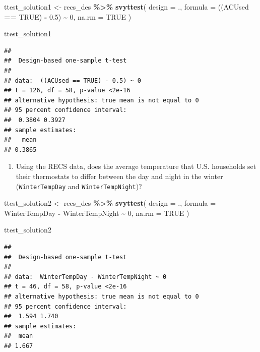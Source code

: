 \documentclass[
]{krantz}
\makeatletter
\newenvironment{Shaded}{\begin{snugshade}}{\end{snugshade}}
\newcommand{\AttributeTok}[1]{\textcolor[rgb]{0.27,0.27,0.27}{#1}}
\newcommand{\ConstantTok}[1]{\textcolor[rgb]{0.37,0.37,0.37}{#1}}
\newcommand{\DecValTok}[1]{\textcolor[rgb]{0.06,0.06,0.06}{#1}}
\newcommand{\FloatTok}[1]{\textcolor[rgb]{0.06,0.06,0.06}{#1}}
\newcommand{\FunctionTok}[1]{\textcolor[rgb]{0.27,0.27,0.27}{\textbf{#1}}}
\newcommand{\NormalTok}[1]{#1}
\newcommand{\OtherTok}[1]{\textcolor[rgb]{0.37,0.37,0.37}{#1}}
\newcommand{\SpecialCharTok}[1]{\textcolor[rgb]{0.43,0.43,0.43}{\textbf{#1}}}
\providecommand{\tightlist}{%
  \setlength{\itemsep}{0pt}\setlength{\parskip}{0pt}}
\newenvironment{kframe}{%
\medskip{}
\setlength{\fboxsep}{.8em}
 \def\at@end@of@kframe{}%
 \ifinner\ifhmode%
  \def\at@end@of@kframe{\end{minipage}}%
  \begin{minipage}{\columnwidth}%
 \fi\fi%
 \def\FrameCommand##1{\hskip\@totalleftmargin \hskip-\fboxsep
 \colorbox{shadecolor}{##1}\hskip-\fboxsep
     \hskip-\linewidth \hskip-\@totalleftmargin \hskip\columnwidth}%
 \MakeFramed {\advance\hsize-\width
   \@totalleftmargin\z@ \linewidth\hsize
   \@setminipage}}%
 {\par\unskip\endMakeFramed%
 \at@end@of@kframe}
\renewenvironment{Shaded}{\begin{kframe}}{\end{kframe}}
\makeatother
\begin{document}
\begin{Shaded}
\begin{Highlighting}[]
\NormalTok{ttest\_solution1 }\OtherTok{\textless{}{-}}\NormalTok{ recs\_des }\SpecialCharTok{\%\textgreater{}\%}
  \FunctionTok{svyttest}\NormalTok{(}
    \AttributeTok{design =}\NormalTok{ .,}
    \AttributeTok{formula =}\NormalTok{ ((ACUsed }\SpecialCharTok{==} \ConstantTok{TRUE}\NormalTok{) }\SpecialCharTok{{-}} \FloatTok{0.5}\NormalTok{) }\SpecialCharTok{\textasciitilde{}} \DecValTok{0}\NormalTok{,}
    \AttributeTok{na.rm =} \ConstantTok{TRUE}
\NormalTok{  )}

\NormalTok{ttest\_solution1}
\end{Highlighting}
\end{Shaded}

\begin{verbatim}
## 
##  Design-based one-sample t-test
## 
## data:  ((ACUsed == TRUE) - 0.5) ~ 0
## t = 126, df = 58, p-value <2e-16
## alternative hypothesis: true mean is not equal to 0
## 95 percent confidence interval:
##  0.3804 0.3927
## sample estimates:
##   mean 
## 0.3865
\end{verbatim}

\begin{enumerate}
\def\labelenumi{\arabic{enumi}.}
\setcounter{enumi}{1}
\tightlist
\item
  Using the RECS data, does the average temperature that U.S. households set their thermostats to differ between the day and night in the winter (\texttt{WinterTempDay} and \texttt{WinterTempNight})?
\end{enumerate}

\begin{Shaded}
\begin{Highlighting}[]
\NormalTok{ttest\_solution2 }\OtherTok{\textless{}{-}}\NormalTok{ recs\_des }\SpecialCharTok{\%\textgreater{}\%}
  \FunctionTok{svyttest}\NormalTok{(}
    \AttributeTok{design =}\NormalTok{ .,}
    \AttributeTok{formula =}\NormalTok{ WinterTempDay }\SpecialCharTok{{-}}\NormalTok{ WinterTempNight }\SpecialCharTok{\textasciitilde{}} \DecValTok{0}\NormalTok{,}
    \AttributeTok{na.rm =} \ConstantTok{TRUE}
\NormalTok{  )}

\NormalTok{ttest\_solution2}
\end{Highlighting}
\end{Shaded}

\begin{verbatim}
## 
##  Design-based one-sample t-test
## 
## data:  WinterTempDay - WinterTempNight ~ 0
## t = 46, df = 58, p-value <2e-16
## alternative hypothesis: true mean is not equal to 0
## 95 percent confidence interval:
##  1.594 1.740
## sample estimates:
##  mean 
## 1.667
\end{verbatim}
\end{document}
